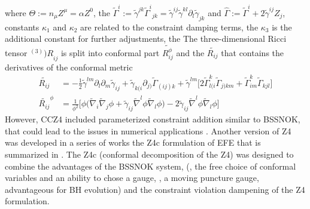%
where $\Theta:=n_{\mu}Z^{\mu}=\alpha Z^0$, the $\widetilde{\Gamma}^i:=\widetilde{\gamma}^{jk}{\widetilde{\Gamma}^i}_{jk} = \widetilde{\gamma}^{ij}\widetilde{\gamma}^{kl}\partial_{l}\widetilde{\gamma}_{jk}$ and $\hat{\Gamma}:=\widetilde{\Gamma}^i + 2\widetilde{\gamma}^{ij}Z_j$, constants $\kappa_1$ and $\kappa_2$ are related to the constraint damping terms, the $\kappa_3$ is the additional constant for further adjustments, the The three-dimensional Ricci tensor ${^{(3)})R}_{ij}$ is split into conformal part $\widetilde{R_{ij}^{\phi}}$ and the $\widetilde{R_{ij}}$ that contains the derivatives of the conformal metric
%
\begin{equation*}
\begin{aligned}
    \widetilde{R_{ij}} &= -\frac{1}{2}\widetilde{\gamma}^{lm}\partial_{l}\partial_{m}\widetilde{\gamma}_{ij} + \widetilde{\gamma}_{k(i}\partial_{j)}\widetilde{\Gamma}_{(ij)k} + \widetilde{\gamma}^{lm}\big[2\widetilde{\Gamma}^{k}_{l(i}\widetilde{\Gamma}_{j)km} + \widetilde{\Gamma}^{k}_{im}\widetilde{\Gamma}_{kjl}\big]  \\
    \widetilde{R_{ij}}^{\phi} &= \frac{1}{\phi^2}\big[\phi\big(\widetilde{\nabla}_{i}\widetilde{\nabla}_{j}\phi + \widetilde{\gamma}_{ij}\widetilde{\nabla}^{l}\phi\widetilde{\nabla}_{l}\phi\big) - 2\widetilde{\gamma}_{ij}\widetilde{\nabla}^{l}\phi\widetilde{\nabla}_{l}\phi\big] 
\end{aligned}
\end{equation*}
%
However, CCZ4 included parameterized constraint addition similar to BSSNOK, 
that could lead to the issues in numerical applications \citep{Babiuc:2006wk}.
%
Another version of Z4 was developed in a series of works 
\citet{Bernuzzi:2009ex,Ruiz:2010qj,Weyhausen:2011cg,Cao:2011fu,Hilditch:2012fp} 
the Z4c formulation of \ac{EFE} that is summarized in \citet{Hilditch:2012fp}. 
%
The Z4c (conformal decomposition of the Z4) was designed to combine the advantages of the 
BSSNOK system, (\ie, the free choice of conformal variables and an ability to chose a gauge, 
\eg, a moving puncture gauge, advantageous for \ac{BH} evolution) and 
the constraint violation dampening of the Z4 formulation.

